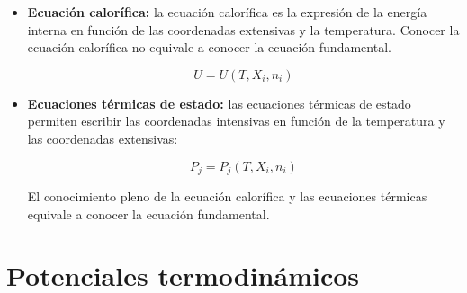 \documentclass[12pt,a4paper]{article}
\begin{document}
\begin{itemize}
\item  \textbf{Ecuación calorífica:} la ecuación calorífica es la expresión de la energía interna en función de las coordenadas extensivas y la temperatura. Conocer la ecuación calorífica no equivale a conocer la ecuación fundamental. 


\begin{equation}
U = U(T, X_i, n_i)
\end{equation}

\item \textbf{Ecuaciones térmicas de estado:} las ecuaciones térmicas de estado permiten escribir las coordenadas intensivas en función de la temperatura y las coordenadas extensivas:

\begin{equation}
P_j = P_j (T, X_i, n_i)
\end{equation}

El conocimiento pleno de la ecuación calorífica y las ecuaciones térmicas equivale a conocer la ecuación fundamental.

\end{itemize}


\newpage

\section{Potenciales termodinámicos}
\end{document}
